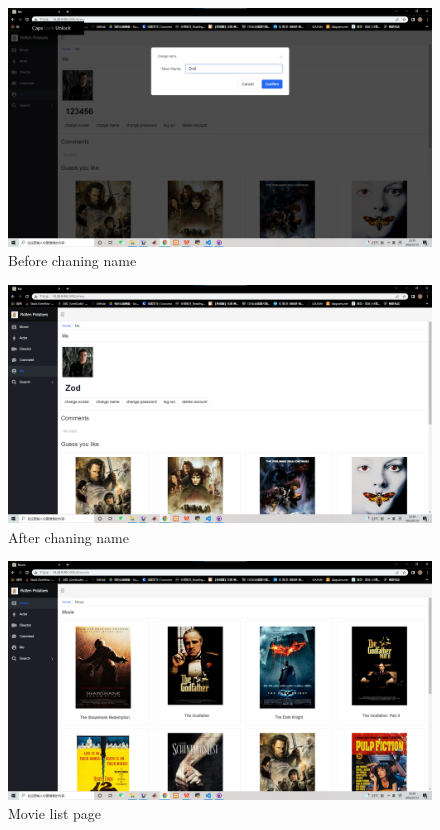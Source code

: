 \begin{CJK*}{UTF8}{gbsn}
    \begin{figure}[htbp]
    \centering
    \includegraphics[width=1\textwidth]{res_name1.png}
    \caption{Before chaning name}
    \end{figure}
    
    \begin{figure}[htbp]
    \centering
    \includegraphics[width=1\textwidth]{res_name2.png}
    \caption{After chaning name}
    \end{figure}
    
    \begin{figure}[htbp]
    \centering
    \includegraphics[width=1\textwidth]{res_movie1.png}
    \caption{Movie list page}
    \end{figure}
    

\end{CJK*}
